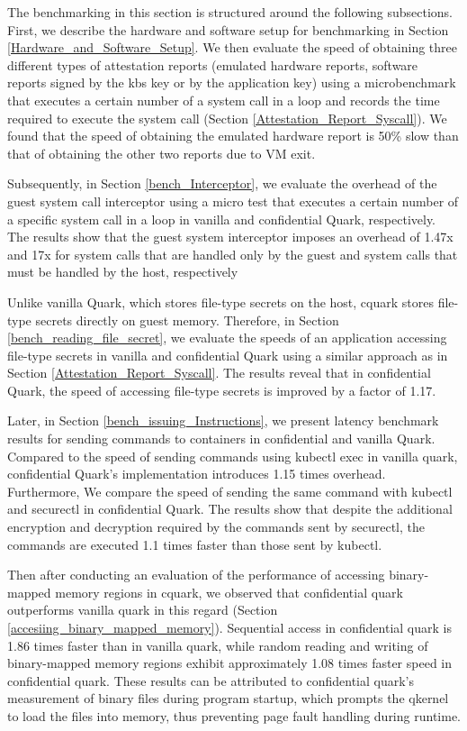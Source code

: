 The benchmarking in this section is structured around the following subsections. First, we describe the hardware and software setup for benchmarking in Section \ref{Hardware_and_Software_Setup}. We then evaluate the speed of obtaining three different types of attestation reports (emulated hardware 
reports, software reports signed by the kbs key or by the application key) using a microbenchmark that executes a certain number of a system call in a loop and records the time required to execute the system call (Section \ref{Attestation_Report_Syscall}). We found that the speed of obtaining the 
emulated hardware report is 50\% slow than that of obtaining the other two reports due to VM exit. 

Subsequently, in Section \ref{bench_Interceptor}, we evaluate the overhead of the guest system call interceptor using a micro test that executes a certain number of a specific system call in a loop in vanilla and confidential Quark, respectively. The results show that the guest system interceptor imposes an overhead of 1.47x 
and 17x for system calls that are handled only by the guest and system calls that must be handled by the host, respectively

Unlike vanilla Quark, which stores file-type secrets on the host, cquark stores file-type secrets directly on guest memory. Therefore, in Section \ref{bench_reading_file_secret}, we evaluate the speeds of an application accessing file-type secrets in vanilla and confidential Quark using a similar 
approach as in Section \ref{Attestation_Report_Syscall}. The results reveal that in confidential Quark, the speed of accessing file-type secrets is improved by a factor of 1.17.

Later, in Section \ref{bench_issuing_Instructions}, we present latency  benchmark results for sending commands to containers in confidential and vanilla Quark. Compared to the speed of sending commands using kubectl exec\cite*{kubectl} in vanilla quark, confidential Quark's implementation 
introduces 1.15 times overhead. Furthermore, We compare the speed of sending the same command with kubectl and securectl in confidential Quark. The results show that despite the additional encryption and decryption required by the commands sent by securectl, the commands are 
executed 1.1 times faster than those sent by kubectl.

Then after conducting an evaluation of the performance of accessing binary-mapped memory regions in cquark, we observed that confidential quark outperforms vanilla quark in this regard (Section \ref{accesiing_binary_mapped_memory}). Sequential access in confidential quark is 1.86 times faster than in 
vanilla quark, while random reading and writing of binary-mapped memory regions exhibit approximately 1.08 times faster speed in confidential quark. These results can be attributed to confidential quark's measurement of binary files during program startup, which prompts the qkernel to load 
the files into memory, thus preventing  page fault handling during runtime.

